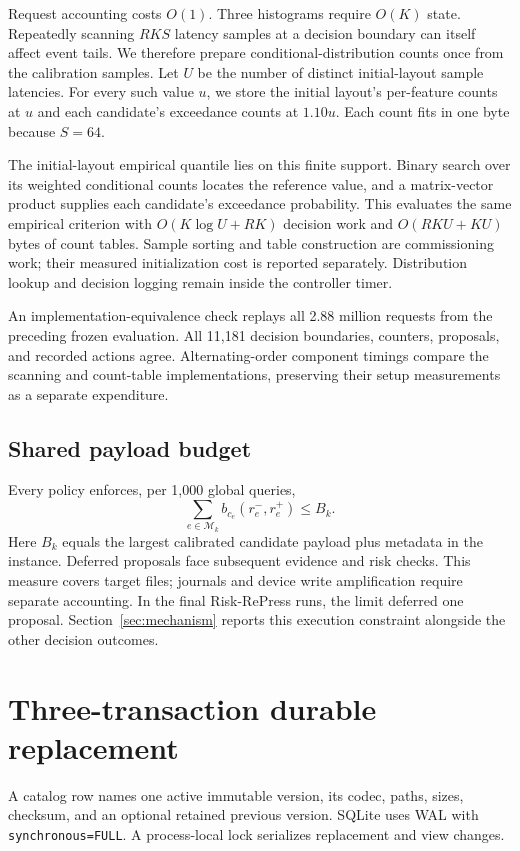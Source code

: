 Request accounting costs $O(1)$. Three histograms require $O(K)$ state. Repeatedly scanning $RKS$ latency samples at a decision boundary can itself affect event tails. We therefore prepare conditional-distribution counts once from the calibration samples. Let $U$ be the number of distinct initial-layout sample latencies. For every such value $u$, we store the initial layout's per-feature counts at $u$ and each candidate's exceedance counts at $1.10u$. Each count fits in one byte because $S=64$.

The initial-layout empirical quantile lies on this finite support. Binary search over its weighted conditional counts locates the reference value, and a matrix-vector product supplies each candidate's exceedance probability. This evaluates the same empirical criterion with $O(K\log U+RK)$ decision work and $O(RKU+KU)$ bytes of count tables. Sample sorting and table construction are commissioning work; their measured initialization cost is reported separately. Distribution lookup and decision logging remain inside the controller timer.

An implementation-equivalence check replays all 2.88 million requests from the preceding frozen evaluation. All 11,181 decision boundaries, counters, proposals, and recorded actions agree. Alternating-order component timings compare the scanning and count-table implementations, preserving their setup measurements as a separate expenditure.

\subsection{Shared payload budget}
Every policy enforces, per 1,000 global queries,
\begin{equation}
\sum_{e\in\mathcal M_k}b_{c_e}(r_e^-,r_e^+)\leq B_k.
\label{eq:budget}
\end{equation}
Here $B_k$ equals the largest calibrated candidate payload plus metadata in the instance. Deferred proposals face subsequent evidence and risk checks. This measure covers target files; journals and device write amplification require separate accounting. In the final Risk-RePress runs, the limit deferred one proposal. Section~\ref{sec:mechanism} reports this execution constraint alongside the other decision outcomes.

\section{Three-transaction durable replacement}
\label{sec:execution}
A catalog row names one active immutable version, its codec, paths, sizes, checksum, and an optional retained previous version. SQLite uses WAL with \texttt{synchronous=FULL}. A process-local lock serializes replacement and view changes.

